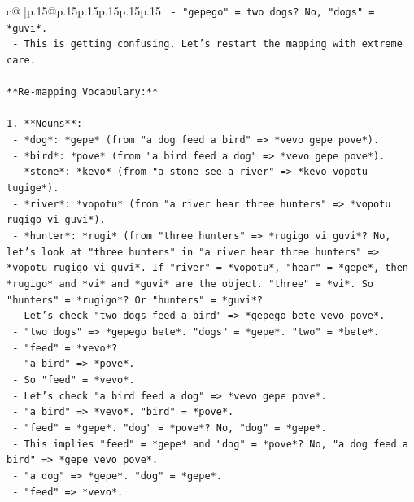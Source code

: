 \documentclass{article}
\begin{document}
{\begin{supertabular}{c@{$\;$}|p{.15\linewidth}@{}p{.15\linewidth}p{.15\linewidth}p{.15\linewidth}p{.15\linewidth}p{.15\linewidth}}
{{{\texttt{          {-} "gepego" = two dogs? No, "dogs" = *guvi*.} \\
\texttt{          {-} This is getting confusing. Let's restart the mapping with extreme care.} \\
\\ 
\texttt{**Re{-}mapping Vocabulary:**} \\
\\ 
\texttt{1.  **Nouns**:} \\
\texttt{    {-}   *dog*: *gepe* (from "a dog feed a bird" => *vevo gepe pove*).} \\
\texttt{    {-}   *bird*: *pove* (from "a bird feed a dog" => *vevo gepe pove*).} \\
\texttt{    {-}   *stone*: *kevo* (from "a stone see a river" => *kevo vopotu tugige*).} \\
\texttt{    {-}   *river*: *vopotu* (from "a river hear three hunters" => *vopotu rugigo vi guvi*).} \\
\texttt{    {-}   *hunter*: *rugi* (from "three hunters" => *rugigo vi guvi*? No, let's look at "three hunters" in "a river hear three hunters" => *vopotu rugigo vi guvi*. If "river" = *vopotu*, "hear" = *gepe*, then *rugigo* and *vi* and *guvi* are the object. "three" = *vi*. So "hunters" = *rugigo*? Or "hunters" = *guvi*?} \\
\texttt{        {-}   Let's check "two dogs feed a bird" => *gepego bete vevo pove*.} \\
\texttt{            {-}   "two dogs" => *gepego bete*. "dogs" = *gepe*. "two" = *bete*.} \\
\texttt{            {-}   "feed" = *vevo*?} \\
\texttt{            {-}   "a bird" => *pove*.} \\
\texttt{            {-}   So "feed" = *vevo*.} \\
\texttt{        {-}   Let's check "a bird feed a dog" => *vevo gepe pove*.} \\
\texttt{            {-}   "a bird" => *vevo*. "bird" = *pove*.} \\
\texttt{            {-}   "feed" = *gepe*. "dog" = *pove*? No, "dog" = *gepe*.} \\
\texttt{            {-}   This implies "feed" = *gepe* and "dog" = *pove*? No, "a dog feed a bird" => *gepe vevo pove*.} \\
\texttt{            {-}   "a dog" => *gepe*. "dog" = *gepe*.} \\
\texttt{            {-}   "feed" => *vevo*.} \\
}}}
\end{supertabular}}
\end{document}
